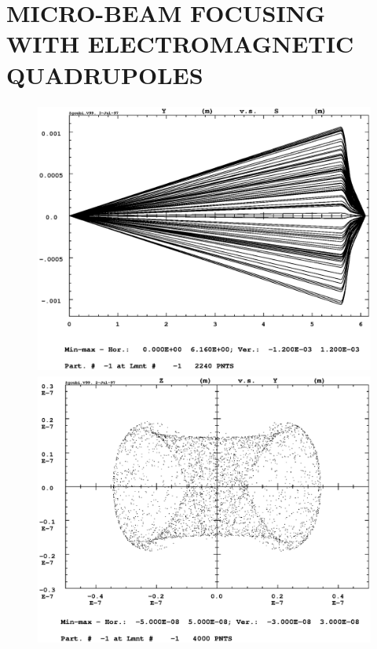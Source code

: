 \clearpage

\onecolumn



\section{MICRO-BEAM FOCUSING WITH ELECTROMAGNETIC QUADRUPOLES}
\vfill

\begin{figure}[H]
  \centerline{\includegraphics[height=9cm]{FigC7-1.ps}}
  \centerline{\includegraphics[height=9cm]{FigC7-2.ps}}

\end{figure}

